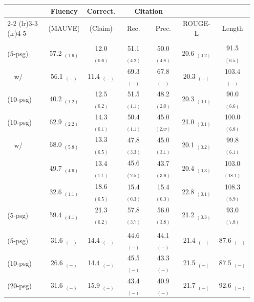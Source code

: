 \documentclass[11pt]{article}
\newcommand\tf[1]{\textbf{#1}}
\newcommand{\vani}{{\sc{Vanilla}}}
\newcommand{\summ}{{\sc{Summ}}}
\newcommand{\snippet}{{\sc{Snippet}}}
\newcommand{\interact}{{\sc{Interact}}}
\newcommand{\search}{{\sc{InlineSearch}}}
\newcommand{\rerank}{{\sc{Rerank}}}
\newcommand{\close}{{\sc{ClosedBook}}}
\newcommand{\oracle}{{\sc{Oracle}}}
\newcommand{\tableskip}{\noalign{\vskip 2pt}}
\newcommand{\headercolorlong}{\rowcolor{gray!17}}
\begin{document}



\begin{table}[h]
    \centering
    \small
        \begin{tabular}{lcccccc}
            \toprule
            & \tf{Fluency} & \tf{Correct.} & \multicolumn{2}{c}{\tf{Citation} }\\
            \cmidrule(lr){2-2} \cmidrule(lr){3-3} \cmidrule(lr){4-5}
            & (MAUVE) & (Claim) & Rec. & Prec. & ROUGE-L & Length \\
            \midrule
            \headercolorlong
            \multicolumn{7}{c}{\textbf{ChatGPT}} \\

            \vani{} (5-psg) & 57.2 $_{(1.6)}$ & 12.0 $_{(0.6)}$ & 51.1 $_{(4.2)}$ & 50.0 $_{(4.8)}$ & 20.6 $_{(0.2)}$ & 91.5 $_{(6.5)}$   \\
            ~~w/ \rerank{} & 56.1 $_{(-)}$ & 11.4 $_{(-)}$ & 69.3 $_{(-)}$ & 67.8 $_{(-)}$ & 20.3 $_{(-)}$ & 103.4 $_{(-)}$ \\
          \summ{} (10-psg)& 40.2 $_{(1.2)}$ & 12.5 $_{(0.2)}$ & 51.5 $_{(1.1)}$ & 48.2 $_{(2.0)}$ & 20.3 $_{(0.1)}$ & 90.0 $_{(6.6)}$   \\
          \snippet{} (10-psg) & 62.9 $_{(2.2)}$ & 14.3 $_{(0.1)}$ & 50.4 $_{(1.1)}$ & 45.0  $_{(2.w)}$ & 21.0 $_{(0.1)}$ & 100.0 $_{(6.8)}$   \\
          ~~w/ \interact{} & 68.0 $_{(5.8)}$ & 13.3 $_{(0.5)}$ & 47.8 $_{(3.3)}$ & 45.0  $_{(3.1)}$ & 20.1 $_{(0.2)}$ & 99.8 $_{(6.1)}$   \\
          \search{} & 49.7 $_{(4.6)}$ & 13.4 $_{(1.1)}$ & 45.6 $_{(2.5)}$ &43.7  $_{(3.9)}$ & 20.4 $_{(0.3)}$ & 103.0 $_{(18.1)}$   \\
       \close{} & 32.6 $_{(1.1)}$ & 18.6 $_{(0.5)}$ & 15.4 $_{(0.3)}$ & 15.4 $_{(0.3)}$ & 22.8 $_{(0.1)}$ & 108.3 $_{(8.9)}$   \\
       \oracle{} (5-psg) & 59.4 $_{(4.1)}$ & 21.3 $_{(0.2)}$ & 57.8 $_{(3.7)}$ & 56.0  $_{(3.8)}$ & 21.2 $_{(0.3)}$ & 93.0 $_{(7.8)}$   \\




            \headercolorlong
            \multicolumn{7}{c}{\textbf{ChatGPT-16K}} \\
            \tableskip
            \vani{} (5-psg)  & 31.6 $_{(-)}$&14.4 $_{(-)}$&44.6 $_{(-)}$&44.1 $_{(-)}$&21.4 $_{(-)}$&87.6 $_{(-)}$\\  
            \vani{} (10-psg) & 26.6 $_{(-)}$&14.4 $_{(-)}$&45.5 $_{(-)}$&43.3 $_{(-)}$&21.5 $_{(-)}$&87.5 $_{(-)}$\\
            \vani{} (20-psg) & 31.6 $_{(-)}$&15.9 $_{(-)}$&43.4 $_{(-)}$&40.9 $_{(-)}$&21.7 $_{(-)}$&92.6 $_{(-)}$\\


\end{tabular}
\end{table}
\end{document}
